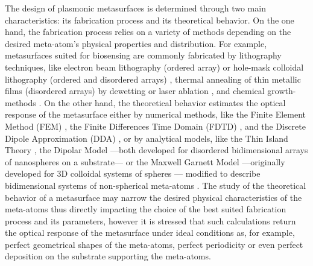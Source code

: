 The design of plasmonic metasurfaces is determined through two main characteristics: its fabrication process and its theoretical behavior. On the one hand, the fabrication process relies on a variety of methods depending on the desired meta-atom's physical properties and distribution. For example, metasurfaces suited for biosensing are commonly  fabricated by lithography techniques, like electron beam lithography (ordered array) or hole-mask colloidal lithography  (ordered and disordered arrays) \cite{estevez_trends_2014}, thermal annealing of thin metallic films (disordered arrays) by dewetting \cite{qiu_dual_2020} or laser ablation \cite{meng_anisotropic_2015}, and chemical growth-methods \cite{estevez_trends_2014,kabashin_plasmonic_2009}. On the other hand, the theoretical behavior estimates the optical response of the metasurface either by numerical methods, like the Finite Element Method (FEM) \cite{feuz_improving_2010}, the Finite Differences Time Domain (FDTD) \cite{qiu_differential_2015}, and the Discrete Dipole Approximation (DDA) \cite{meng_anisotropic_2015}, or by analytical models, like the Thin Island Theory \cite{svedendahl_refractometric_2014,bedeaux_optical_2004}, the Dipolar Model \cite{barrera1991optical} ---both developed for disordered bidimensional arrays of nanospheres on a substrate--- or the Maxwell Garnett Model ---originally developed for 3D colloidal systems of spheres \cite{sihvola_electromagnetic_2008}--- modified to describe bidimensional systems of non-spherical meta-atoms \cite{oates_characterization_2011,kabashin_plasmonic_2009,moirangthem_enhanced_2012}. The study of the theoretical behavior of a metasurface may narrow the desired physical characteristics of the meta-atoms thus directly impacting the choice of the best suited fabrication process and its parameters, however it is stressed that such calculations return the optical response of the metasurface under ideal conditions as, for example, perfect geometrical shapes of the meta-atoms, perfect periodicity or even perfect deposition on the substrate supporting the meta-atoms.

